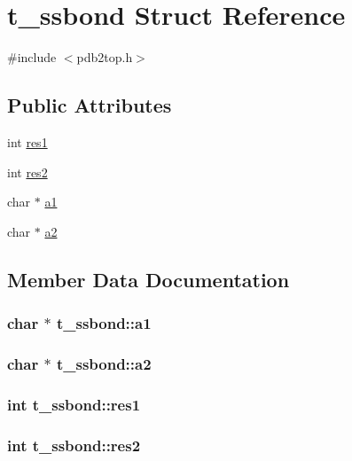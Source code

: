 \hypertarget{structt__ssbond}{\section{t\-\_\-ssbond \-Struct \-Reference}
\label{structt__ssbond}
}


{\ttfamily \#include $<$pdb2top.\-h$>$}

\subsection*{\-Public \-Attributes}
\begin{DoxyCompactItemize}
\item 
int \hyperlink{structt__ssbond_a5dc156b89ebdf40d4894d59ea42d7b86}{res1}
\item 
int \hyperlink{structt__ssbond_af617052dcb4714aa507f68b7f03d92cd}{res2}
\item 
char $\ast$ \hyperlink{structt__ssbond_ac489c4b77cbb3a28b9aa4421ffb4ff9a}{a1}
\item 
char $\ast$ \hyperlink{structt__ssbond_a54ec3722bd5c81861eae56444511e45e}{a2}
\end{DoxyCompactItemize}


\subsection{\-Member \-Data \-Documentation}
\hypertarget{structt__ssbond_ac489c4b77cbb3a28b9aa4421ffb4ff9a}{
\subsubsection[{a1}]{\setlength{\rightskip}{0pt plus 5cm}char $\ast$ {\bf t\-\_\-ssbond\-::a1}}}\label{structt__ssbond_ac489c4b77cbb3a28b9aa4421ffb4ff9a}
\hypertarget{structt__ssbond_a54ec3722bd5c81861eae56444511e45e}{
\subsubsection[{a2}]{\setlength{\rightskip}{0pt plus 5cm}char $\ast$ {\bf t\-\_\-ssbond\-::a2}}}\label{structt__ssbond_a54ec3722bd5c81861eae56444511e45e}
\hypertarget{structt__ssbond_a5dc156b89ebdf40d4894d59ea42d7b86}{
\subsubsection[{res1}]{\setlength{\rightskip}{0pt plus 5cm}int {\bf t\-\_\-ssbond\-::res1}}}\label{structt__ssbond_a5dc156b89ebdf40d4894d59ea42d7b86}
\hypertarget{structt__ssbond_af617052dcb4714aa507f68b7f03d92cd}{
\subsubsection[{res2}]{\setlength{\rightskip}{0pt plus 5cm}int {\bf t\-\_\-ssbond\-::res2}}}\label{structt__ssbond_af617052dcb4714aa507f68b7f03d92cd}


